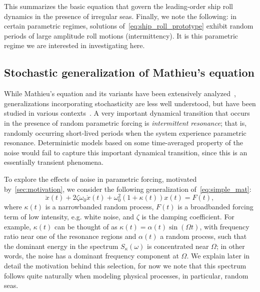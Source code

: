 \documentclass[3p]{elsarticle}
\begin{document}
This summarizes the basic equation that govern  the leading-order  ship roll dynamics in the presence of irregular seas. Finally, we note the following: in certain parametric regimes,  solutions of~\cref{eq:ship_roll_prototype}  exhibit random periods of large amplitude roll motions (intermittency). It is this parametric regime   we are interested in  investigating here. 

\subsection{Stochastic generalization of  Mathieu's equation}

While   Mathieu's equation and its variants have been extensively analyzed~\cite{dynamicsofparametricexcit,nayfeh_mook}, generalizations incorporating stochasticity  are less well understood, but have been studied in various contexts~\cite{Soong_Grigoriou93,Lin_Cai95,Poulin1885,doi:10.1137/070689322,stratonovich1967topics}. A very important  dynamical transition that   occurs in the presence of random parametric forcing is \emph{intermittent resonance}; that is, randomly occurring short-lived periods when the system experience parametric resonance. Deterministic models based on some time-averaged property of the noise   would fail to capture this   important dynamical transition, since this is an essentially   transient phenomena.   

To explore the effects of  noise in parametric forcing, motivated by~\cref{sec:motivation},  we consider the following generalization of~\cref{eq:simple_mat}:
\begin{equation}\label{eq:mat_simple_stoch}
\ddot x(t) + 2 \zeta \omega_0 \dot x(t)+  \omega_0^2(1  + \kappa(t)) x(t) =   F(t),
\end{equation}
where $\kappa(t)$ is a  narrowbanded  random process,  $F(t)$ is a broadbanded forcing term of low intensity, e.g. white noise, and  $\zeta$ is the damping
coefficient. For example, $\kappa(t)$ can be thought of as $\kappa (t) =  \alpha(t) \sin(\Omega t)$, with  frequency ratio near one of the resonance regions and $\alpha(t)$ a  random process, such that the dominant energy in the spectrum $S_{\kappa}(\omega)$ is concentrated near $\Omega$; in other words, the noise has a dominant frequency component  at $\Omega$.   We explain later in detail the motivation behind this selection, for now we note that this spectrum follows quite naturally when  modeling    physical processes, in particular, random seas.
\end{document}
